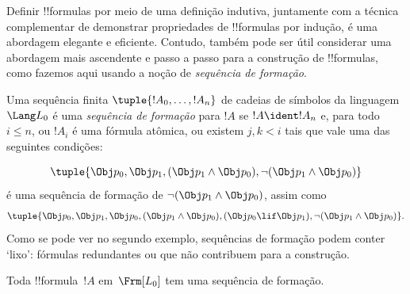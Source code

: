\documentclass[../../../include/open-logic-section]{subfiles}
\begin{document}


Definir !!{formula}s por meio de uma definição indutiva, juntamente com a
técnica complementar de demonstrar propriedades de !!{formula}s por indução,
é uma abordagem elegante e eficiente. Contudo, também pode ser útil considerar
uma abordagem mais ascendente e passo a passo para a construção de
!!{formula}s, como fazemos aqui usando a noção de \emph{sequência de formação}.

\begin{defn}
Uma sequência finita $\tuple{!A_0,\dotsc,!A_n}$ de cadeias de símbolos da
linguagem~$\Lang L_0$ é uma \emph{sequência de formação} para $!A$ se
$!A \ident !A_n$ e, para todo $i \leq n$, ou $!A_i$ é uma fórmula atômica,
ou existem $j,k < i$ tais que vale uma das seguintes condições:
\begin{enumerate}
\end{enumerate}
\end{defn}

\begin{ex}
\[
\tuple{
    \Obj p_0,
    \Obj p_1,
    (\Obj p_1 \land \Obj p_0),
    \lnot (\Obj p_1 \land \Obj p_0)
}
\]
é uma sequência de formação de
$\lnot (\Obj p_1 \land \Obj p_0)$, assim como
\[
\tuple{
    \Obj p_0,
    \Obj p_1,
    \Obj p_0,
    (\Obj p_1 \land \Obj p_0),
    (\Obj p_0 \lif \Obj p_1),
    \lnot (\Obj p_1 \land \Obj p_0)
}.
\]
%
Como se pode ver no segundo exemplo, sequências de formação podem conter
`lixo': fórmulas redundantes ou que não contribuem para a construção.
\end{ex}

\begin{prop}
Toda !!{formula}~$!A$ em~$\Frm[L_0]$ tem uma sequência de formação.
\end{prop}
\end{document}
